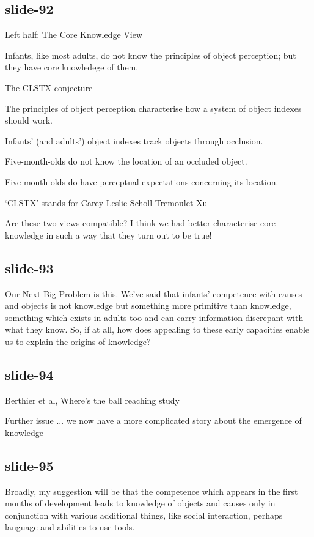 \documentclass[12pt,\papersize]{extarticle}
\begin{document}
\subsection{slide-92}
Left half:
The Core Knowledge View



Infants, like most adults, do not know the principles of object perception; but they have core knowledege of them.


The CLSTX conjecture



The principles of object perception characterise how a system of object indexes should work.



Infants’ (and adults’) object indexes track objects through occlusion.



Five-month-olds do not know the location of an occluded object.



Five-month-olds do have perceptual expectations concerning its location.


‘CLSTX’ stands for Carey-Leslie-Scholl-Tremoulet-Xu \citep[see][]{Leslie:1998zk,Scholl:1999mi,Carey:2001ue,scholl:2007_objecta}

Are these two views compatible?
I think we had better characterise core knowledge in such a way that they
turn out to be true!

\subsection{slide-93}
Our Next Big Problem is this.
We've said that infants' competence with causes and objects is not knowledge but something
more primitive than knowledge, something which exists in adults too and can carry information
discrepant with what they know.
So, if at all, how does appealing to these early capacities enable us to explain the origins
of knowledge?

\subsection{slide-94}
Berthier et al, Where’s the ball reaching study

Further issue ... we now have a more complicated story about the emergence of knowledge

\subsection{slide-95}
Broadly, my suggestion will be that the competence which appears in the first months of
development leads to knowledge of objects and causes only in conjunction with various
additional things, like social interaction, perhaps language and abilities to use tools.
\end{document}
